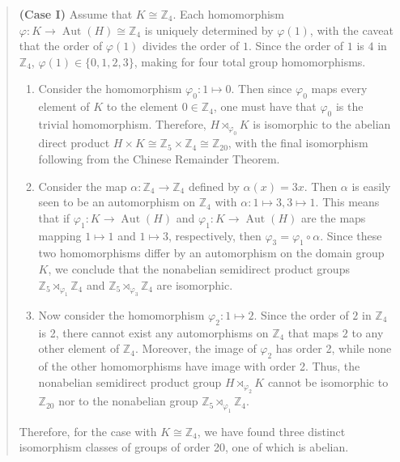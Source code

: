 \documentclass{article}
\begin{document}
	\begin{quote}
		\textbf{(Case I)} Assume that $K \cong \mathbb{Z}_{4}$. Each homomorphism $\varphi: K \to \operatorname{Aut}(H) \cong \mathbb{Z}_{4}$ is uniquely determined by $\varphi(1)$, with the caveat that the order of $\varphi(1)$ divides the order of $1$. Since the order of $1$ is $4$ in $\mathbb{Z}_{4}$, $\varphi(1) \in \{0,1,2,3\}$, making for four total group homomorphisms. 
		\begin{enumerate}[itemsep =-2pt,label = (\roman{*})]
			\item Consider the homomorphism $\varphi_{0}: 1 \mapsto 0$. Then since $\varphi_{0}$ maps every element of $K$ to the element $0 \in \mathbb{Z}_{4}$, one must have that $\varphi_{0}$ is the trivial homomorphism. Therefore, $H \rtimes_{\varphi_{0}} K$ is isomorphic to the abelian direct product $H \times K \cong \mathbb{Z}_{5} \times \mathbb{Z}_{4} \cong \mathbb{Z}_{20}$, with the final isomorphism following from the Chinese Remainder Theorem. 
			\item Consider the map $\alpha: \mathbb{Z}_{4} \to \mathbb{Z}_{4}$ defined by $\alpha(x) = 3x$. Then $\alpha$ is easily seen to be an automorphism on $\mathbb{Z}_{4}$ with $\alpha: 1 \mapsto 3, 3 \mapsto 1$. This means that if $\varphi_{1}: K \to \operatorname{Aut}(H)$ and $\varphi_{1}: K \to \operatorname{Aut}(H)$ are the maps mapping $1 \mapsto 1$ and $1 \mapsto 3$, respectively, then $\varphi_{3} = \varphi_{1} \circ \alpha$. Since these two homomorphisms differ by an automorphism on the domain group $K$, we conclude that the nonabelian semidirect product groups $\mathbb{Z}_{5} \rtimes_{\varphi_{1}} \mathbb{Z}_{4}$ and $\mathbb{Z}_{5} \rtimes_{\varphi_{3}} \mathbb{Z}_{4}$ are isomorphic. 
			\item Now consider the homomorphism $\varphi_{2}: 1 \mapsto 2$. Since the order of $2$ in $\mathbb{Z}_{4}$ is 2, there cannot exist any automorphisms on $\mathbb{Z}_{4}$ that maps $2$ to any other element of $\mathbb{Z}_{4}$. Moreover, the image of $\varphi_{2}$ has order 2, while none of the other homomorphisms have image with order 2. Thus, the nonabelian semidirect product group $H \rtimes_{\varphi_{2}} K$ cannot be isomorphic to $\mathbb{Z}_{20}$ nor to the nonabelian group $\mathbb{Z}_{5} \rtimes_{\varphi_{1}} \mathbb{Z}_{4}$. 
		\end{enumerate}
		
		Therefore, for the case with $K \cong \mathbb{Z}_{4}$, we have found three distinct isomorphism classes of groups of order 20, one of which is abelian. 
		

\end{quote}
\end{document}
